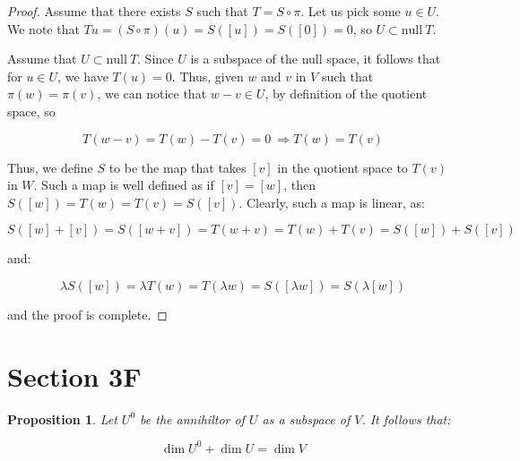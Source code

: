 \documentclass[10pt, oneside]{article}
\newtheorem{prop}{Proposition}
\begin{document}
    \begin{proof}

      Assume that there exists $S$ such that $T = S \circ \pi$. Let us pick some $u \in U$. We note that $Tu = (S \circ \pi)(u) = S([u]) = S([0]) = 0$,
      so $U \subset \text{null} \ T$.
      \newline

      Assume that $U \subset \text{null} \ T$. Since $U$ is a subspace of the null space, it follows that for $u \in U$, we have $T(u) = 0$. Thus,
      given $w$ and $v$ in $V$ such that $\pi(w) = \pi(v)$, we can notice that $w - v \in U$, by definition of the quotient space, so

      $$T(w - v) = T(w) - T(v) = 0 \ \Rightarrow T(w) = T(v)$$

      Thus, we define $S$ to be the map that takes $[v]$ in the quotient space to $T(v)$ in $W$. Such a map is well defined as if $[v] = [w]$, then
      $S([w]) = T(w) = T(v) = S([v])$. Clearly, such a map is linear, as:

      $$S([w] + [v]) = S([w + v]) = T(w + v) = T(w) + T(v) = S([w]) + S([v])$$

      and:

      $$\lambda S([w]) = \lambda T(w) = T(\lambda w) = S([\lambda w]) = S(\lambda [w])$$

      and the proof is complete.

    \end{proof}

    \section{Section 3F}

    \begin{prop}
      Let $U^0$ be the annihiltor of $U$ as a subspace of $V$. It follows that:

      $$\dim U^{0} + \dim U = \dim V$$
    \end{prop}
\end{document}
